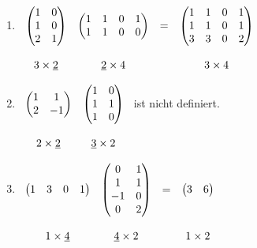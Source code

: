 \documentclass[../../main.tex]{subfiles}
\begin{document}
\begin{bsp}\label{7.2.3}\mbox{}\\
\begin{enumerate}[\normalfont(a)]
\item
$
\begin{array}[t]{cccc}
\begin{pmatrix}1&0\\1&0\\2&1\end{pmatrix}&\begin{pmatrix}1&1&0&1\\1&1&0&0\end{pmatrix}&=&\begin{pmatrix}1&1&0&1\\1&1&0&1\\3&3&0&2\end{pmatrix}\\
\\
3\times\underline2&\underline2\times4&&3\times4
\end{array}
$
\item
$
\begin{array}[t]{cc}
\begin{pmatrix}1&1\\2&-1\end{pmatrix}&\begin{pmatrix}1&0\\1&1\\1&0\end{pmatrix}\\
\\
2\times\underline2&\underline3\times2
\end{array}
$ ist nicht definiert.
\item
$
\begin{array}[t]{cccc}
\begin{pmatrix}1&3&0&1\end{pmatrix}&\begin{pmatrix}0&1\\1&1\\-1&0\\0&2\end{pmatrix}&=&\begin{pmatrix}3&6\end{pmatrix}\\
\\
1\times\underline4&\underline4\times2&&1\times2
\end{array}
$
\end{enumerate}
\end{bsp}
\end{document}
